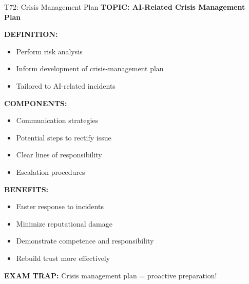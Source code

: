 \documentclass[8pt]{beamer}
\begin{document}
	\begin{frame}{T72: Crisis Management Plan}
		\fontsize{6.5}{7.5}\selectfont
		\textbf{TOPIC: AI-Related Crisis Management Plan}
		
		\vspace{0.1cm}
		\textbf{DEFINITION:}
		\begin{itemize}
			\item Perform risk analysis
			\item Inform development of crisis-management plan
			\item Tailored to AI-related incidents
		\end{itemize}
		
		\vspace{0.1cm}
		\textbf{COMPONENTS:}
		\begin{itemize}
			\item Communication strategies
			\item Potential steps to rectify issue
			\item Clear lines of responsibility
			\item Escalation procedures
		\end{itemize}
		
		\vspace{0.1cm}
		\textbf{BENEFITS:}
		\begin{itemize}
			\item Faster response to incidents
			\item Minimize reputational damage
			\item Demonstrate competence and responsibility
			\item Rebuild trust more effectively
		\end{itemize}
		
		\textcolor{myred}{\textbf{EXAM TRAP:}} Crisis management plan = \textcolor{myblue}{proactive preparation}!
	\end{frame}
	
	
\end{document}
